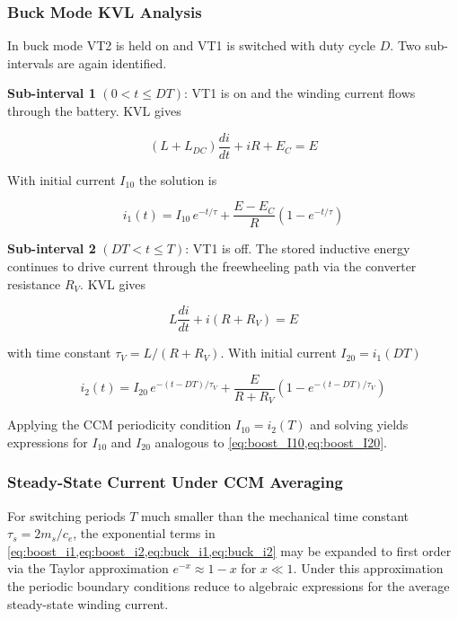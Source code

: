 \subsubsection{Buck Mode KVL Analysis}
\label{subsubsec:buck_kvl}

In buck mode VT2 is held on and VT1 is switched with duty cycle $D$.
Two sub-intervals are again identified.

\textbf{Sub-interval 1} $(0 < t \leq DT)$: VT1 is on and the winding
current flows through the battery. KVL gives

\begin{equation}
    (L + L_{DC})\frac{di}{dt} + iR + E_C = E
    \label{eq:buck_on}
\end{equation}

With initial current $I_{10}$ the solution is

\begin{equation}
    i_1(t) = I_{10}\,e^{-t/\tau}
             + \frac{E - E_C}{R}
               \!\left(1 - e^{-t/\tau}\right)
    \label{eq:buck_i1}
\end{equation}

\textbf{Sub-interval 2} $(DT < t \leq T)$: VT1 is off. The stored
inductive energy continues to drive current through the freewheeling
path via the converter resistance $R_V$. KVL gives

\begin{equation}
    L\frac{di}{dt} + i(R + R_V) = E
    \label{eq:buck_off}
\end{equation}

with time constant $\tau_V = L/(R + R_V)$. With initial current
$I_{20} = i_1(DT)$

\begin{equation}
    i_2(t) = I_{20}\,e^{-(t-DT)/\tau_V}
             + \frac{E}{R + R_V}
               \!\left(1 - e^{-(t-DT)/\tau_V}\right)
    \label{eq:buck_i2}
\end{equation}

Applying the CCM periodicity condition $I_{10} = i_2(T)$ and solving
yields expressions for $I_{10}$ and $I_{20}$ analogous to
\cref{eq:boost_I10,eq:boost_I20}.

\subsubsection{Steady-State Current Under CCM Averaging}
\label{subsubsec:ccm_avg}

For switching periods $T$ much smaller than the mechanical time
constant $\tau_s = 2m_s/c_e$, the exponential terms in
\cref{eq:boost_i1,eq:boost_i2,eq:buck_i1,eq:buck_i2} may be
expanded to first order via the Taylor approximation
$e^{-x} \approx 1 - x$ for $x \ll 1$. Under this approximation
the periodic boundary conditions reduce to algebraic expressions
for the average steady-state winding current.

